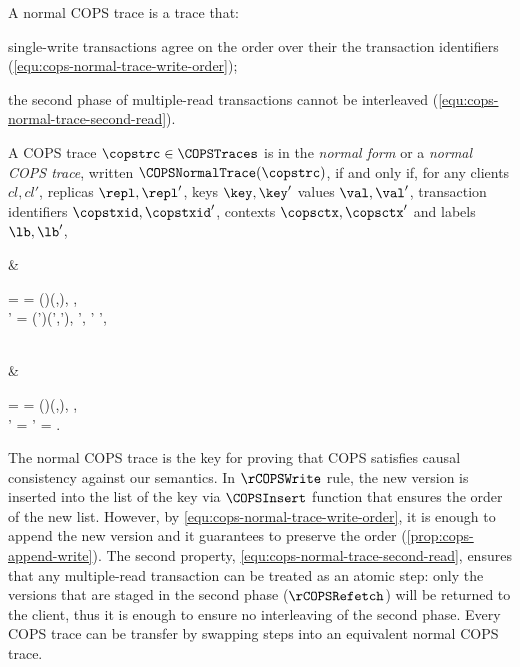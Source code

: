 A normal COPS trace is a trace that: \begin{enumerate*}
\item single-write transactions agree on the order over their the transaction identifiers (\cref{equ:cops-normal-trace-write-order});
\item the second phase of multiple-read transactions cannot be interleaved (\cref{equ:cops-normal-trace-second-read}).
\end{enumerate*}

\begin{definition}
\label{def:cops-normal-trace}
A COPS trace \( \copstrc \in \COPSTraces \) is in the \emph{normal form} or a \emph{normal COPS trace}, 
written \( \COPSNormalTrace(\copstrc) \), if and only if,
for any clients \( cl, cl'\), replicas \( \repl, \repl'\), keys \( \key, \key' \)
values \( \val,\val' \), transaction identifiers \( \copstxid, \copstxid' \),
contexts \( \copsctx, \copsctx' \) and labels \( \lb,\lb'\),
\begin{Formulae}
& \begin{Formula}
    \copstrc = 
    \land \lb = \lbCOPSWrite[\cl](\repl){\opW(\key,\val), \copstxid, \copsctx }
    \\ {} \land \lb' = \lbCOPSWrite[\cl'](\repl'){\opW(\key',\val'), \copstxid', \copsctx' }
    \implies \copstxid \copstxidleq  \copstxid',
\label{equ:cops-normal-trace-write-order}
\end{Formula}
\\ & \begin{Formula}
    \copstrc = 
    \land \lb = \lbCOPSRefetch[\cl](\repl){\opW(\key,\val), \copstxid, \copsctx }
    \\ \implies \lb' = 
    \lor \lb' = \lbCOPSFinishRead{\copsctx}.
\label{equ:cops-normal-trace-second-read}
\end{Formula}
\end{Formulae}
\end{definition}

The normal COPS trace is the key for proving that COPS satisfies causal consistency against our semantics.
In \(\rCOPSWrite\) rule, the new version is inserted into 
the list of the key via \( \COPSInsert \) function that ensures the order of the new list.
However, by \cref{equ:cops-normal-trace-write-order}, it is enough to append the new version and 
it guarantees to preserve the order (\cref{prop:cops-append-write}).
The second property, \cref{equ:cops-normal-trace-second-read}, ensures that 
any multiple-read transaction can be treated as an atomic step:
only the versions that are staged in the second phase (\(\rCOPSRefetch\))
will be returned to the client, 
thus it is enough to ensure no interleaving of the second phase.
Every COPS trace can be transfer by swapping steps into an equivalent normal COPS trace.

